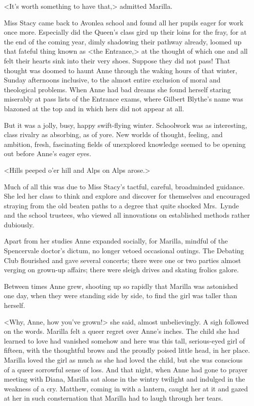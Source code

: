 <It's worth something to have that,> admitted Marilla.

Miss Stacy came back to Avonlea school and found all her pupils eager for work once more. Especially did the Queen's class gird up their loins for the fray, for at the end of the coming year, dimly shadowing their pathway already, loomed up that fateful thing known as <the Entrance,> at the thought of which one and all felt their hearts sink into their very shoes. Suppose they did not pass! That thought was doomed to haunt Anne through the waking hours of that winter, Sunday afternoons inclusive, to the almost entire exclusion of moral and theological problems. When Anne had bad dreams she found herself staring miserably at pass lists of the Entrance exams, where Gilbert Blythe's name was blazoned at the top and in which hers did not appear at all.

But it was a jolly, busy, happy swift-flying winter. Schoolwork was as interesting, class rivalry as absorbing, as of yore. New worlds of thought, feeling, and ambition, fresh, fascinating fields of unexplored knowledge seemed to be opening out before Anne's eager eyes.

<Hills peeped o'er hill and Alps on Alps arose.>

Much of all this was due to Miss Stacy's tactful, careful, broadminded guidance. She led her class to think and explore and discover for themselves and encouraged straying from the old beaten paths to a degree that quite shocked Mrs.~Lynde and the school trustees, who viewed all innovations on established methods rather dubiously.

Apart from her studies Anne expanded socially, for Marilla, mindful of the Spencervale doctor's dictum, no longer vetoed occasional outings. The Debating Club flourished and gave several concerts; there were one or two parties almost verging on grown-up affairs; there were sleigh drives and skating frolics galore.

Between times Anne grew, shooting up so rapidly that Marilla was astonished one day, when they were standing side by side, to find the girl was taller than herself.

<Why, Anne, how you've grown!> she said, almost unbelievingly. A sigh followed on the words. Marilla felt a queer regret over Anne's inches. The child she had learned to love had vanished somehow and here was this tall, serious-eyed girl of fifteen, with the thoughtful brows and the proudly poised little head, in her place. Marilla loved the girl as much as she had loved the child, but she was conscious of a queer sorrowful sense of loss. And that night, when Anne had gone to prayer meeting with Diana, Marilla sat alone in the wintry twilight and indulged in the weakness of a cry. Matthew, coming in with a lantern, caught her at it and gazed at her in such consternation that Marilla had to laugh through her tears.

